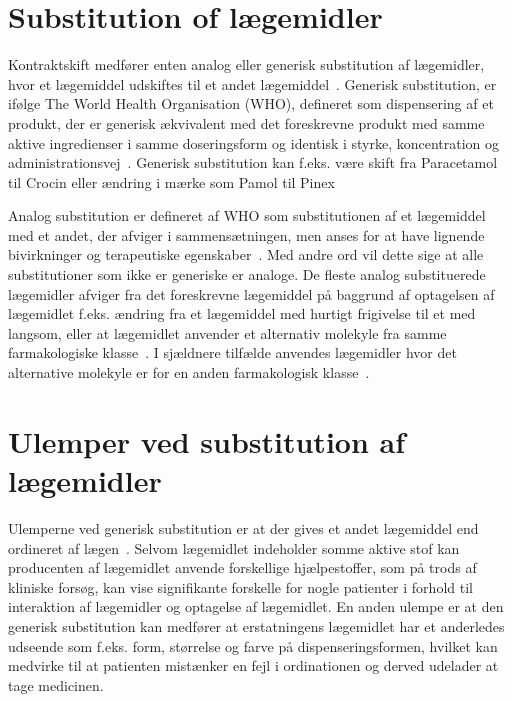 \section{Substitution of lægemidler}
Kontraktskift medfører enten analog eller generisk substitution af lægemidler, hvor et lægemiddel udskiftes til et andet lægemiddel~\citep{DanskSelskabforPatientsikkerhed2009}.
Generisk substitution, er ifølge The World Health Organisation (WHO), defineret som dispensering af et produkt, der er generisk ækvivalent med det foreskrevne produkt med samme aktive ingredienser i samme doseringsform og identisk i styrke, koncentration og administrationsvej~\citep{Kairi2017}. Generisk substitution kan f.eks. være skift fra Paracetamol til Crocin eller ændring i mærke som Pamol til Pinex~\citep{Kairi2017} 

Analog substitution er defineret af WHO som substitutionen af et lægemiddel med et andet, der afviger i sammensætningen, men anses for at have lignende bivirkninger og terapeutiske egenskaber~\citep{Kairi2017}. Med andre ord vil dette sige at alle substitutioner som ikke er generiske er analoge. De fleste analog substituerede lægemidler afviger fra det foreskrevne lægemiddel på baggrund af optagelsen af lægemidlet f.eks. ændring fra et lægemiddel med hurtigt frigivelse til et med langsom, eller at lægemidlet anvender et alternativ molekyle fra samme farmakologiske klasse~. I sjældnere tilfælde anvendes lægemidler hvor det alternative molekyle er for en anden farmakologisk klasse~.~\citep{Kairi2017}

\section{Ulemper ved substitution af lægemidler}
Ulemperne ved generisk substitution er at der gives et andet lægemiddel end ordineret af lægen~\citep{Kairi2017}. Selvom lægemidlet indeholder somme aktive stof kan producenten af lægemidlet anvende forskellige hjælpestoffer, som på trods af kliniske forsøg, kan vise signifikante forskelle for nogle patienter i forhold til interaktion af lægemidler og optagelse af lægemidlet. En anden ulempe er at den generisk substitution kan medfører at erstatningens lægemidlet har et anderledes udseende som f.eks. form, størrelse og farve på dispenseringsformen, hvilket kan medvirke til at patienten mistænker en fejl i ordinationen og derved udelader at tage medicinen.~\citep{Kairi2017}

